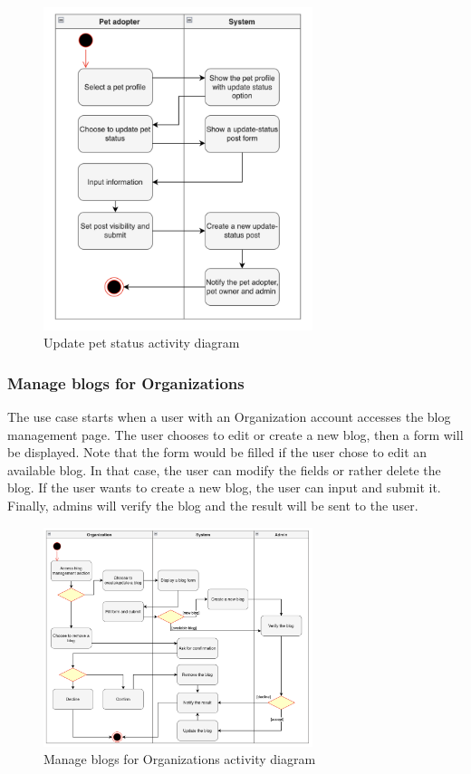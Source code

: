 \begin{figure}[H]
  \centering
  \includegraphics[width=0.7\textwidth]{Figures/pet_status.png}
  \caption{Update pet status activity diagram}
  \label{fig:update-pet-status}
\end{figure}

\subsubsection{Manage blogs for Organizations}

The use case starts when a user with an Organization account accesses the blog management page. The user chooses to edit or create a new blog, then a form will be displayed. Note that the form would be filled if the user chose to edit an available blog. In that case, the user can modify the fields or rather delete the blog. If the user wants to create a new blog, the user can input and submit it. Finally, admins will verify the blog and the result will be sent to the user.

\begin {figure}[H]
\centering
\includegraphics[width=0.7\textwidth]{Figures/manage_blog_org.png}
\caption{Manage blogs for Organizations activity diagram}
\label{fig:manage-blog}
\end{figure}

